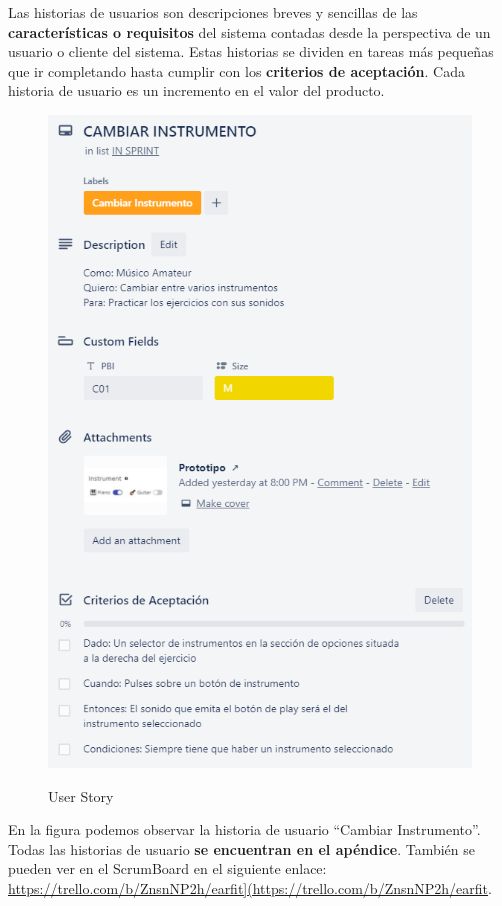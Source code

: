 \documentclass[12pt,twoside,titlepage]{report}
\begin{document}
Las historias de usuarios son descripciones breves y sencillas de las \textbf{características o requisitos} del sistema contadas desde la perspectiva de un usuario o cliente del sistema. Estas historias se dividen en tareas más pequeñas que ir completando hasta cumplir con los \textbf{criterios de aceptación}. Cada historia de usuario es un incremento en el valor del producto.

\begin{figure}[H]
    \centering
    \includegraphics[scale=0.7]{Scrum/UserStory}
    \label{fig:UserStory}
    \caption{User Story}
\end{figure}

En la figura podemos observar la historia de usuario ``Cambiar Instrumento''. Todas las historias de usuario \textbf{se encuentran en el apéndice}. También se pueden ver en el ScrumBoard en el siguiente enlace: \url{https://trello.com/b/ZnsnNP2h/earfit](https://trello.com/b/ZnsnNP2h/earfit}.
\end{document}
